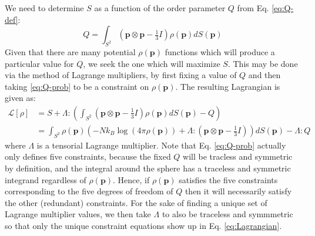 \documentclass[reqno]{article}
\begin{document}
  We need to determine $S$ as a function of the order parameter $Q$ from Eq. \eqref{eq:Q-def}:
  \begin{equation} \label{eq:Q-prob}
    Q
    =
    \int_{S^2} \left(\mathbf{p} \otimes \mathbf{p} - \tfrac13 I\right) \rho(\mathbf{p}) dS(\mathbf{p})
  \end{equation}
  Given that there are many potential $\rho(\mathbf{p})$ functions which will produce a
  particular value for $Q$, we seek the one which will maximize $S$.
  This may be done via the method of Lagrange multipliers, by first fixing a
  value of $Q$ and then taking \eqref{eq:Q-prob} to be a constraint on $\rho(\mathbf{p})$.
  The resulting Lagrangian is given as:
  \begin{equation} \label{eq:Lagrangian}
    \begin{split}
      \mathcal{L}[\rho]
      &=
      S + \Lambda : \left( \int_{S^2} \left(\mathbf{p} \otimes \mathbf{p} - \tfrac13 I\right) \rho(\mathbf{p}) dS(\mathbf{p}) - Q \right) \\
      &=
      \int_{S^2} \rho(\mathbf{p})
      \left( -N k_B \log \left( 4 \pi \rho(\mathbf{p}) \right) + \Lambda : (\mathbf{p} \otimes \mathbf{p} - \tfrac13 I) \right) dS(\mathbf{p}) - \Lambda : Q
    \end{split}
  \end{equation}
  where $\Lambda$ is a tensorial Lagrange multiplier.
  Note that Eq. \eqref{eq:Q-prob} actually only defines five constraints, because
  the fixed $Q$ will be tracless and symmetric by definition, and the integral
  around the sphere has a traceless and symmetric integrand regardless of
  $\rho(\mathbf{p})$.
  Hence, if $\rho(\mathbf{p})$ satisfies the five constraints corresponding to the five
  degrees of freedom of $Q$ then it will necessarily satisfy the other
  (redundant) constraints.
  For the sake of finding a unique set of Lagrange multiplier values, we then
  take $\Lambda$ to also be traceless and symmmetric so that only the unique constraint
  equations show up in Eq. \eqref{eq:Lagrangian}.
  
\end{document}
